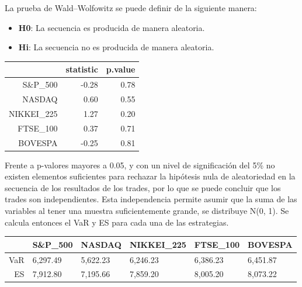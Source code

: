 \documentclass[a4paper,12pt]{Latex/Classes/PhDthesisPSnPDF}
\begin{document}
La prueba de Wald–Wolfowitz se puede definir de la siguiente manera:

\begin{itemize}
\item \textbf{H0}: La secuencia es producida de manera aleatoria.
\item \textbf{Hi}: La secuencia no es producida de manera aleatoria.
\end{itemize}

 
\begin{center}
\begin{table}[ht]
\centering
\begin{tabular}{rrr}
  \hline
 & statistic & p.value \\ 
  \hline
S\&P\_500 & -0.28 & 0.78 \\ 
  NASDAQ & 0.60 & 0.55 \\ 
  NIKKEI\_225 & 1.27 & 0.20 \\ 
  FTSE\_100 & 0.37 & 0.71 \\ 
  BOVESPA & -0.25 & 0.81 \\ 
   \hline
\end{tabular}
\end{table}\end{center}

Frente a p-valores mayores a 0.05, y con un nivel de significación del 5\% no existen elementos suficientes para rechazar la hipótesis nula de aleatoriedad en la secuencia de los resultados de los trades, por lo que se puede concluir que los trades son independientes. Esta independencia permite asumir que la suma de las variables al tener una muestra suficientemente grande, se distribuye N(0, 1). Se calcula entonces el VaR y ES para cada una de las estrategias.


\begin{center}
\begin{table}[ht]
\centering
\begin{tabular}{rlllll}
  \hline
 & S\&P\_500 & NASDAQ & NIKKEI\_225 & FTSE\_100 & BOVESPA \\ 
  \hline
VaR & 6,297.49 & 5,622.23 & 6,246.23 & 6,386.23 & 6,451.87 \\ 
  ES & 7,912.80 & 7,195.66 & 7,859.20 & 8,005.20 & 8,073.22 \\ 
   \hline
\end{tabular}
\end{table}\end{center}
  
\end{document}
